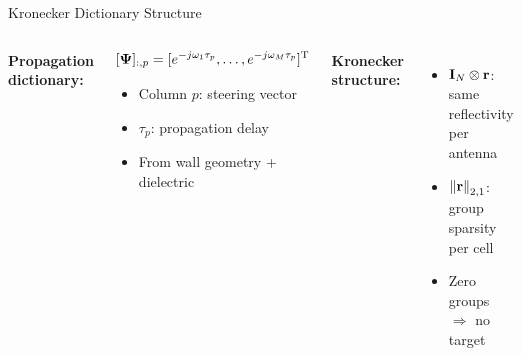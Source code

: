 \begin{frame}{Kronecker Dictionary Structure}

  \begin{columns}[T]
      \vspace{0.3em}

      \textbf{Propagation dictionary:}

      \vspace{0.2em}
      \begin{shibuiframe}{ }
        \small
        \[
          [\boldsymbol{\Psi}]_{:,p} = [e^{-j\omega_1 \tau_p}, \ldots, e^{-j\omega_{M} \tau_p}]^{\mathrm{T}}
        \]
        \vspace{0.1em}
        \begin{itemize}
          \setlength{\itemsep}{0.06em}
          \item Column $p$: steering vector
          \item $\tau_p$: propagation delay
          \item From wall geometry + dielectric
        \end{itemize}
      \end{shibuiframe}

      \vspace{0.3em}
      \textbf{Kronecker structure:}
      \begin{itemize}
        \setlength{\itemsep}{0.06em}
        \item $\mathbf{I}_{N} \otimes \mathbf{r}$: same reflectivity per antenna
        \pause
        \item $\left\| \mathbf{r} \right\|_{2,1}$: group sparsity per cell
        \pause
        \item Zero groups $\Rightarrow$ no target
      \end{itemize}

      \vspace{0.2em}

      \vspace{0.3em}
      \centering
  \end{columns}
\end{frame}

